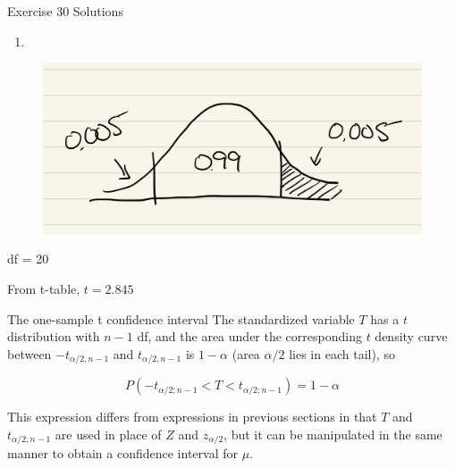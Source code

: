 \documentclass[
  ignorenonframetext,
]{beamer}
\providecommand{\tightlist}{%
  \setlength{\itemsep}{0pt}\setlength{\parskip}{0pt}}\usepackage{longtable,booktabs,array}
\begin{document}
\begin{frame}{Exercise 30 Solutions}
\protect\hypertarget{exercise-30-solutions-2}{}
\begin{enumerate}[<+->]
[a.]
\setcounter{enumi}{2}
\tightlist
\item
\end{enumerate}

\begin{figure}

{\centering \includegraphics{images/central99-01.png}

}

\end{figure}

df = 20

From t-table, \(t = 2.845\)
\end{frame}

\begin{frame}{The one-sample t confidence interval}
\protect\hypertarget{the-one-sample-t-confidence-interval}{}
The standardized variable \(T\) has a \(t\) distribution with \(n-1\)
df, and the area under the corresponding \(t\) density curve between
\(-t_{\alpha/2,n-1}\) and \(t_{\alpha/2,n-1}\) is \(1-\alpha\) (area
\(\alpha/2\) lies in each tail), so

\[
P(-t_{\alpha/2;n-1} < T < t_{\alpha/2;n-1}) = 1 - \alpha
\]

This expression differs from expressions in previous sections in that
\(T\) and \(t_{\alpha/2,n-1}\) are used in place of \(Z\) and
\(z_{\alpha/2}\), but it can be manipulated in the same manner to obtain
a confidence interval for \(\mu\).
\end{frame}
\end{document}
